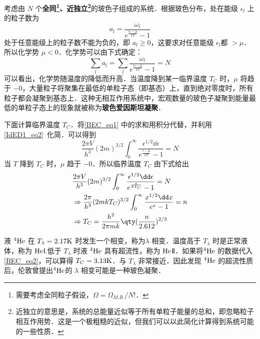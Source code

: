 

考虑由 $N$ 个\textbf{全同\footnote{需要考虑全同粒子假设，$\Omega=\Omega_{M.B.}/N!$．}、近独立\footnote{近独立的意思是，系统的总能量近似等于所有单粒子能量的总和，即忽略粒子相互作用势．这是一个极粗糙的近似，但我们可以以此简化计算得到系统可能的一些性质．}}的玻色子组成的系统．根据玻色分布，处在能级 $\epsilon_l$ 上的粒子数为
\begin{equation}
a_l=\frac{\omega_l}{e^{\frac{\epsilon_l-\mu}{kT}}-1}
\end{equation}
处于任意能级上的粒子数不能为负的，即 $a_l\ge 0$，这要求对任意能级 $\epsilon_l$都 $>\mu$．所以化学势 $\mu<0$．化学势可以由下式确定：
\begin{equation}\label{BEC_eq1}
\sum_la_l=\sum_l \frac{\omega_l}{e^{\frac{\epsilon_l-\mu}{kT}}-1} =N
\end{equation}
可以看出，化学势随温度的降低而升高．当温度降到某一临界温度 $T_C$ 时，$\mu$ 将趋于 $-0$，大量粒子将聚集在最低的单粒子态（即基态）上，直到绝对零度时，所有粒子都会凝聚到基态上．这种无相互作用系统中，宏观数量的玻色子凝聚到能量最低的单粒子态上的现象就被称为\textbf{玻色爱因斯坦凝聚}．

下面计算临界温度 $T_C$．将\autoref{BEC_eq1} 中的求和用积分代替，并利用\autoref{IdED1_eq2}~化简．可以得到
\begin{equation}
\frac{2\pi V}{h^3}(2m)^{3/2}\int_0^\infty \frac{\epsilon^{1/2}\dd \epsilon}{e^{\frac{\epsilon-\mu}{kT}}-1}=N
\end{equation}
当 $T$ 降到 $T_C$ 时，$\mu$ 趋于 $-0$．所以临界温度 $T_C$ 由下式给出
\begin{equation}\label{BEC_eq2}
\begin{aligned}
&\frac{2\pi V}{h^3}(2m)^{3/2}\int_0^\infty \frac{\epsilon^{1/2}\dd \epsilon}{e^{\frac{\epsilon}{kT_C}}-1}=N\\
&\Rightarrow \frac{2\pi}{h^3}(2mkT_C)^{3/2}\int_0^\infty \frac{x^{1/2}\dd x}{e^x-1}=n\\
&\Rightarrow T_C=\frac{h^2}{2\pi mk}\qty(\frac{n}{2.612})^{2/3}
\end{aligned}
\end{equation}

液 $^4\rm{He}$ 在 $T_\lambda=2.17\rm{K}$ 时发生一个相变，称为$\lambda$ 相变．温度高于 $T_\lambda$ 时是正常液体，称为 $\rm{He}$Ⅰ.低于 $T_\lambda$ 时液 $^4\rm{He}$ 具有超流性，称为 $\rm{He}$Ⅱ．如果将$^4\rm{He}$ 的数据代入 \autoref{BEC_eq2}，可以算得 $T_C=3.13\rm{K}$．与 $T_\lambda$ 非常接近．因此发现 $^4\rm{He}$ 的超流性质后，伦敦曾提出$^4\rm{He}$的 $\lambda$ 相变可能是一种玻色凝聚．